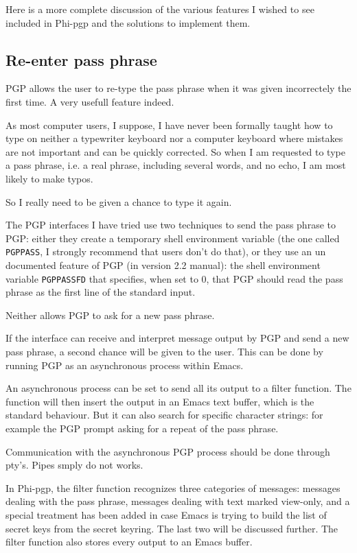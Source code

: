 Here is a more complete discussion of the various features I wished to
see included in Phi-pgp and the solutions to implement them.

\subsection{Re-enter pass phrase}

PGP allows  the  user  to re-type  the pass  phrase   when it  was given
incorrectely the first time. A very usefull feature indeed.

As most computer  users, I suppose, I  have never been formally taught
how to type  on neither a  typewriter keyboard nor a computer keyboard
where mistakes   are not important and  can  be quickly corrected.  So
when I am  requested  to type  a  pass  phrase, i.e.  a   real phrase,
including several words, and no echo, I am most likely to make typos.

So I really need to be given a chance to type it again.

The PGP interfaces I  have tried use  two techniques to send  the pass
phrase  to PGP: either  they  create   a temporary shell   environment
variable  (the one  called {\tt PGPPASS},   I strongly recommend  that
users don't do that), or they use an un  documented feature of PGP (in
version 2.2 manual): the   shell environment variable  {\tt PGPPASSFD}
that specifies, when set to 0, that PGP should read the pass phrase as
the first line of the standard input.

Neither allows PGP to ask for a new pass phrase.

If the interface can  receive and interpret message  output by PGP and
send   a new pass  phrase, a    second chance  will   be given  to the
user. This   can be done by  running  PGP as an   asynchronous process
within Emacs.

An asynchronous process can be set to send all its  output to a filter
function. The  function will then insert  the output in an  Emacs text
buffer, which is the standard  behaviour.  But it  can also search for
specific character strings: for example   the PGP prompt asking for  a
repeat of the pass phrase.

Communication with the   asynchronous PGP process should be  done
through {\sc pty}'s.  Pipes smply do not works.

In     Phi-pgp, the filter   function  recognizes  three categories of
messages: messages dealing with the pass phrase, messages dealing with
text marked view-only, and a special  treatment has been added in case
Emacs  is trying to   build the  list  of secret    keys from the   secret
keyring. The last two will be  discussed further.  The filter function
also stores every output to an Emacs buffer.

